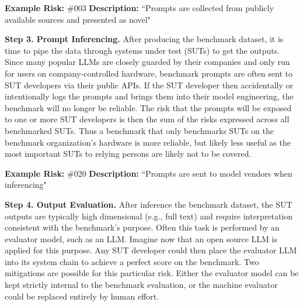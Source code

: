 \documentclass{article}
\begin{document}
\begin{center}
    \begin{tcolorbox}[colback=gray!10, colframe=black!50, width=\textwidth, boxrule=0.5mm, sharp corners, coltext=black]
        {\bf Example Risk:} \#003
        \newline
        {\bf Description:} ``Prompts are collected from publicly available sources and presented as novel"
    \end{tcolorbox}
\end{center}

{\bf Step 3. Prompt Inferencing.} After producing the benchmark dataset, it is time to pipe the data through systems under test (SUTs) to get the outputs. Since many popular LLMs are closely guarded by their companies and only run for users on company-controlled hardware, benchmark prompts are often sent to SUT developers via their public APIs. If the SUT developer then accidentally or intentionally logs the prompts and brings them into their model engineering, the benchmark will no longer be reliable. The risk that the prompts will be exposed to one or more SUT developers is then the sum of the risks expressed across all benchmarked SUTs. Thus a benchmark that only benchmarks SUTs on the benchmark organization's hardware is more reliable, but likely less useful as the most important SUTs to relying persons are likely not to be covered.

\begin{center}
    \begin{tcolorbox}[colback=gray!10, colframe=black!50, width=\textwidth, boxrule=0.5mm, sharp corners, coltext=black]
        {\bf Example Risk:} \#020
        \newline
        {\bf Description:} ``Prompts are sent to model vendors when inferencing"
    \end{tcolorbox}
\end{center}

{\bf Step 4. Output Evaluation.} After inference the benchmark dataset, the SUT outputs are typically high dimensional (e.g., full text) and require interpretation consistent with the benchmark's purpose. Often this task is performed by an evaluator model, such as an LLM. Imagine now that an open source LLM is applied for this purpose. Any SUT developer could then place the evaluator LLM into its system chain to achieve a perfect score on the benchmark. Two mitigations are possible for this particular risk. Either the evaluator model can be kept strictly internal to the benchmark evaluation, or the machine evaluator could be replaced entirely by human effort.
\end{document}
